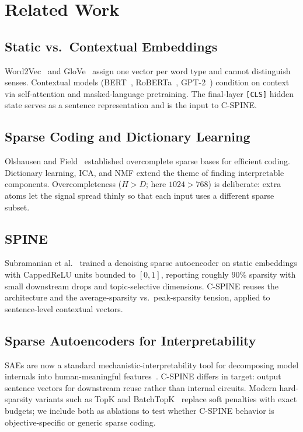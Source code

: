 \documentclass[conference]{IEEEtran}
\begin{document}
\section{Related Work}
\subsection{Static vs.\ Contextual Embeddings}
Word2Vec~\cite{mikolov2013distributed} and GloVe~\cite{pennington2014glove}
assign one vector per word type and cannot distinguish senses. Contextual
models (BERT~\cite{devlin2019bert}, RoBERTa~\cite{liu2019roberta},
GPT-2~\cite{radford2019language}) condition on context via self-attention
and masked-language pretraining. The final-layer \texttt{[CLS]} hidden state
serves as a sentence representation and is the input to C-SPINE.

\subsection{Sparse Coding and Dictionary Learning}
Olshausen and Field~\cite{olshausen1997sparse} established overcomplete
sparse bases for efficient coding. Dictionary learning, ICA, and NMF extend
the theme of finding interpretable components. Overcompleteness
($H>D$; here $1024>768$) is deliberate: extra atoms let the
signal spread thinly so that each input uses a different sparse subset.

\subsection{SPINE}
Subramanian et al.~\cite{subramanian2018spine} trained a denoising sparse
autoencoder on static embeddings with CappedReLU units bounded to
$[0,1]$, reporting roughly 90\% sparsity with small downstream drops and
topic-selective dimensions. C-SPINE reuses the architecture and the
average-sparsity vs.\ peak-sparsity tension, applied to sentence-level
contextual vectors.

\subsection{Sparse Autoencoders for Interpretability}
SAEs are now a standard mechanistic-interpretability tool for decomposing
model internals into human-meaningful features~\cite{bricken2023towards}.
C-SPINE differs in target: output sentence vectors for downstream reuse
rather than internal circuits. Modern hard-sparsity variants such as TopK
and BatchTopK~\cite{gao2024scaling} replace soft penalties with exact
budgets; we include both as ablations to test whether C-SPINE behavior is
objective-specific or generic sparse coding.
\end{document}
